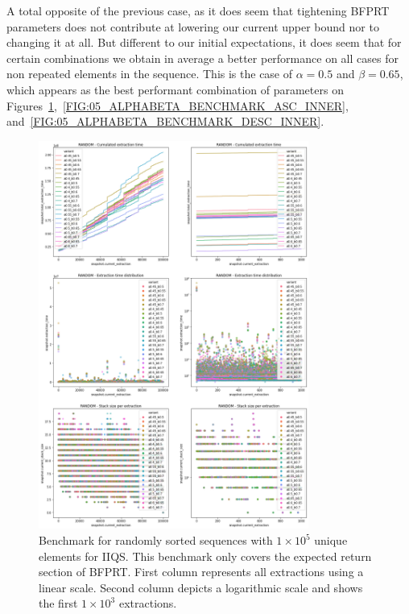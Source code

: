 A total opposite of the previous case, as it does seem that tightening BFPRT parameters does not contribute at lowering our current upper bound nor to changing it at all. But different to our initial expectations, it does seem that for certain combinations we obtain in average a better performance on all cases for non repeated elements in the sequence. This is the case of $\alpha=0.5$ and $\beta=0.65$, which appears as the best performant combination of parameters on Figures~\ref{FIG:05_ALPHABETA_BENCHMARK_RANDOM_INNER},~\ref{FIG:05_ALPHABETA_BENCHMARK_ASC_INNER}, and~\ref{FIG:05_ALPHABETA_BENCHMARK_DESC_INNER}. 


\begin{figure}[!ht]
    \centering
    \includegraphics[width=0.79\textwidth]{./fragments/04_experimental_execution/images/04_alphabeta_detail_random_inner.png}
    \caption{Benchmark for randomly sorted sequences with $1\times10^5$ unique elements for IIQS. This benchmark only covers the expected return section of BFPRT. First column represents all extractions using a linear scale. Second column depicts a logarithmic scale and shows the first $1\times10^3$ extractions. }
    \label{FIG:05_ALPHABETA_BENCHMARK_RANDOM_INNER}
\end{figure}

